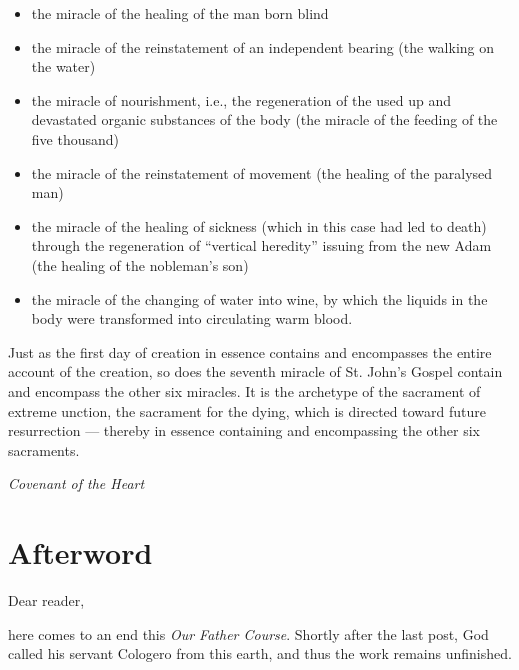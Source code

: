\begin{itemize}
\item the miracle of the healing of the man born blind 
\item the miracle of the reinstatement of an independent bearing (the walking on the water) 
\item the miracle of nourishment, i.e., the regeneration of the used up and devastated organic substances of the body
(the miracle of the feeding of the five thousand) 
\item the miracle of the reinstatement of movement (the healing of the paralysed man) 
\item the miracle of the healing of sickness (which in this case had led to death) through the regeneration of “vertical
heredity” issuing from the new Adam (the healing of the nobleman's son) 
\item the miracle of the changing of water into wine, by which the liquids in the body were transformed into circulating
warm blood. 
\end{itemize}
\begin{quotationx}
Just as the first day of creation in essence contains and encompasses the entire account of the creation, so does the
seventh miracle of St. John's Gospel contain and encompass the other six miracles. It is the
archetype of the sacrament of extreme unction, the sacrament for the dying, which is directed toward future
resurrection — thereby in essence containing and encompassing the other six sacraments. \begin{flushright}
\emph{Covenant of the Heart}\end{flushright}

\end{quotationx}


\section{Afterword}

Dear reader,

here comes to an end this \textit{Our Father Course}. Shortly after the last post, God called his servant Cologero from this earth, and thus the work remains unfinished.